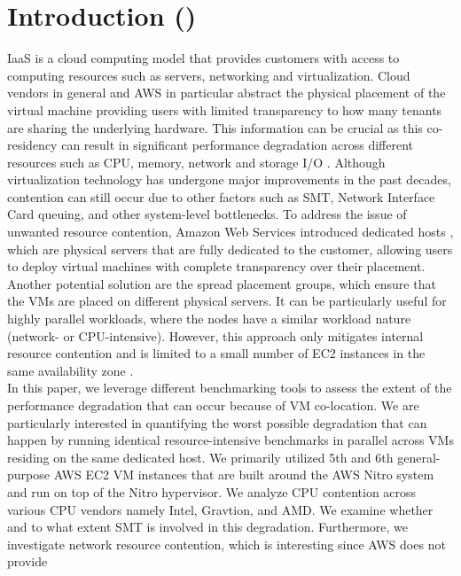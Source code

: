\chapter{Introduction (\checkmark)}\label{chapter:introduction}

\ac{IaaS} is a cloud computing model that provides customers with access to computing 
resources such as servers, networking and virtualization. Cloud vendors in general and \ac{AWS} in particular 
abstract the physical placement of the virtual machine providing users with limited transparency to how 
many tenants are sharing the underlying hardware. This information can be crucial as 
this co-residency can result in significant performance degradation across different resources such as 
CPU, memory, network and storage I/O \cite{characterizing_public} \cite{mitigating_resource}. 
Although virtualization technology has undergone major improvements in 
the past decades, contention can still occur due to other factors such as \ac{SMT}, Network Interface
Card queuing, and other system-level bottlenecks. To address the issue of unwanted resource 
contention, Amazon Web Services introduced dedicated hosts \cite{dedHost}, which are physical servers that are fully 
dedicated to the customer,  allowing users to deploy virtual machines with complete transparency over their
placement. Another potential solution are the spread placement groups, which ensure that the VMs are placed 
on different physical servers. It can be
particularly useful for highly parallel workloads, where the nodes have a similar workload nature
(network- or CPU-intensive). However, this approach only mitigates internal resource contention and is 
limited to a small number of EC2 instances in the same availability zone \cite{spread}. \\
In this paper, we leverage different benchmarking tools to assess the extent of the performance degradation 
that can occur because of VM co-location. We are particularly interested in quantifying the worst possible 
degradation that can happen by running identical resource-intensive benchmarks in parallel across VMs 
residing on the same dedicated host. We primarily utilized 5th and 6th general-purpose \ac{AWS} EC2 VM 
instances that are built around the \ac{AWS} Nitro system and run on top of the Nitro hypervisor. 
We analyze CPU contention across various CPU vendors namely Intel, Gravtion, and AMD. 
We examine whether and to what extent \ac{SMT} is involved in this degradation. 
Furthermore, we investigate network resource contention, which is interesting since \ac{AWS} does not provide
